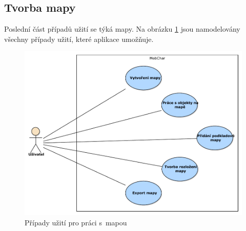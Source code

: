 \documentclass[thesis=B,czech]{resources/FITthesis}[2012/06/26]
\begin{document}
\subsection{Tvorba mapy}
Poslední část případů užití se týká mapy. Na obrázku \ref{fig:uc_mapa} jsou namodelovány všechny případy užití, které aplikace umožňuje.
	\begin{figure}\centering
		\includegraphics[width=1\textwidth]{images/usecase-mapa.pdf}
		\caption[Případy užití pro mapu]{Případy užití pro práci s~mapou}				\label{fig:uc_mapa}
	\end{figure}
	
\end{document}
